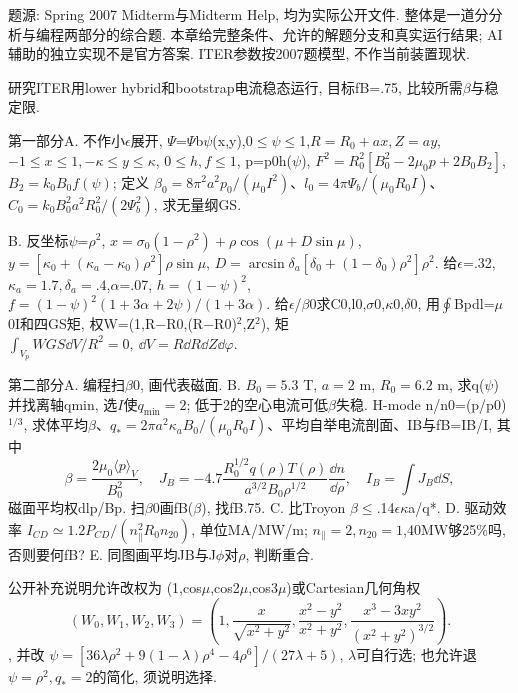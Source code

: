 题源: Spring 2007 Midterm与Midterm Help, 均为实际公开文件. 整体是一道分分析与编程两部分的综合题. 本章给完整条件、允许的解题分支和真实运行结果; AI辅助的独立实现不是官方答案. ITER参数按2007题模型, 不作当前装置现状.
\begin{exercise}\label{ex:07-mid}
研究ITER用lower hybrid和bootstrap电流稳态运行, 目标fB=.75, 比较所需\ensuremath{\beta}与稳定限.

第一部分A. 不作小\ensuremath{\epsilon}展开, \ensuremath{\Psi}=\ensuremath{\Psi}b\ensuremath{\psi}(x,y),0\ensuremath{\le}\ensuremath{\psi}\ensuremath{\le}1,$R=R_0+ax,Z=ay$, $-1\le x\le1,-\kappa\le y\le\kappa$, $0\le h,f\le1$, p=p0h(\ensuremath{\psi}), $F^2=R_0^2[B_0^2-2\mu_0p+2B_0B_2]$, $B_2=k_0B_0f(\psi)$; 定义 $\beta_0=8\pi^2a^2p_0/(\mu_0I^2)$、$l_0=4\pi\Psi_b/(\mu_0R_0I)$、$C_0=k_0B_0^2a^2R_0^2/(2\Psi_b^2)$, 求无量纲GS.

B. 反坐标\ensuremath{\psi}=\ensuremath{\rho}\ensuremath{{}^{2}}, $x=\sigma_0(1-\rho^2)+\rho\cos(\mu+D\sin\mu)$, $y=[\kappa_0+(\kappa_a-\kappa_0)\rho^2]\rho\sin\mu$, $D=\arcsin\delta_a[\delta_0+(1-\delta_0)\rho^2]\rho^2$. 给\ensuremath{\epsilon}=.32,$\kappa_a=1.7,\delta_a=.4$,\ensuremath{\alpha}=.07, $h=(1-\psi)^2$, $f=(1-\psi)^2(1+3\alpha+2\psi)/(1+3\alpha)$. 给\ensuremath{\epsilon}/\ensuremath{\beta}0求C0,l0,\ensuremath{\sigma}0,\ensuremath{\kappa}0,\ensuremath{\delta}0, 用\ensuremath{\oint}Bpdl=\ensuremath{\mu}0I和四GS矩, 权W=(1,R\ensuremath{-}R0,(R\ensuremath{-}R0)\ensuremath{{}^{2}},Z\ensuremath{{}^{2}}), 矩 $\int_{V_p}W GS\dd V/R^2=0,\ \dd V=R\dd R\dd Z\dd\varphi$.

第二部分A. 编程扫\ensuremath{\beta}0, 画代表磁面. B. $B_0=5.3$ T, $a=2$ m, $R_0=6.2$ m, 求q(\ensuremath{\psi})并找离轴qmin, 选$I$使$q_{\min}=2$; 低于2的空心电流可低\ensuremath{\beta}失稳. H-mode n/n0=(p/p0)$^{1/3}$, 求体平均\ensuremath{\beta}、$q_*=2\pi a^2\kappa_aB_0/(\mu_0R_0I)$、平均自举电流剖面、IB与fB=IB/I, 其中
\begin{equation}
 \beta=\frac{2\mu_0\langle p\rangle_V}{B_0^2},\quad
 J_B=-4.7\frac{R_0^{1/2}q(\rho)T(\rho)}{a^{3/2}B_0\rho^{1/2}}\frac{\dd n}{\dd\rho},\quad
 I_B=\int J_B\dd S,
\end{equation}
磁面平均权dlp/Bp. 扫\ensuremath{\beta}0画fB(\ensuremath{\beta}), 找fB.75. C. 比Troyon \ensuremath{\beta}\ensuremath{\le}.14\ensuremath{\epsilon}\ensuremath{\kappa}a/q*. D. 驱动效率 $I_{CD}\simeq1.2P_{CD}/(n_\parallel^2R_0n_{20})$, 单位MA/MW/m; $n_\parallel=2,n_{20}=1$,40MW够25\%吗, 否则要何fB? E. 同图画平均JB与J\ensuremath{\phi}对\ensuremath{\rho}, 判断重合.

公开补充说明允许改权为 (1,cos\ensuremath{\mu},cos2\ensuremath{\mu},cos3\ensuremath{\mu})或Cartesian几何角权
\begin{equation}
 (W_0,W_1,W_2,W_3)=\left(1,\frac{x}{\sqrt{x^2+y^2}},\frac{x^2-y^2}{x^2+y^2},\frac{x^3-3xy^2}{(x^2+y^2)^{3/2}}\right).
\end{equation}, 并改 $\psi=[36\lambda\rho^2+9(1-\lambda)\rho^4-4\rho^6]/(27\lambda+5)$, \ensuremath{\lambda}可自行选; 也允许退$\psi=\rho^2,q_*=2$的简化, 须说明选择.
\end{exercise}
